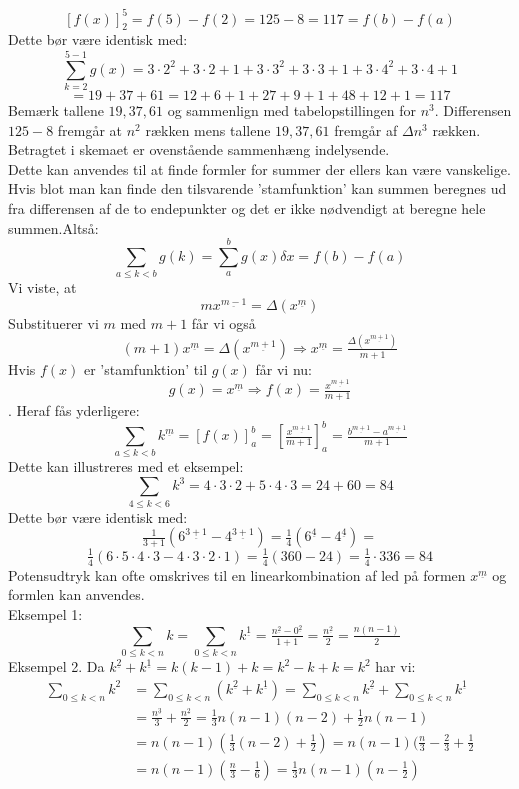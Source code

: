 \[[f(x)]_{2}^{5}=f(5)-f(2)=125-8=117=f(b)-f(a)\]
Dette bør være identisk med:
\[\sum_{k=2}^{5-1}g(x)=3 \cdot 2^{2}+3 \cdot 2+1+3 \cdot 3^{2}+3 \cdot 3+1+3 \cdot 4^{2}+3 \cdot 4+1\]
\[=19+37+61=12+6+1+27+9+1+48+12+1=117\]
Bemærk tallene \(19, 37,61\) og sammenlign med tabelopstillingen for \(n^{3}\). Differensen \(125-8\) fremgår at \(n^{2}\) rækken mens tallene \(19,37,61\) fremgår af \(\Delta n^{3}\) rækken. Betragtet i skemaet er ovenstående sammenhæng indelysende.\\
Dette kan anvendes  til at finde formler for summer der ellers kan være vanskelige. Hvis blot man kan finde den tilsvarende 'stamfunktion' kan summen beregnes ud fra differensen af de to endepunkter og det er ikke nødvendigt at beregne hele summen.Altså:
\[\sum_{a \leq k< b}g(k)=\sum_{a}^{b}g(x)\delta x=f(b)-f(a)\]
Vi viste, at 
\[mx^{\underline{m-1}}=\Delta (x^{\underline{m}})\]
Substituerer vi \(m\) med \(m+1\) får vi også 
\[(m+1)x^{\underline{m}}=\Delta (x^{\underline{m+1}}) \Rightarrow x^{\underline{m}}=\tfrac{\Delta (x^{\underline{m+1}})}{m+1}\]
Hvis \(f(x)\) er 'stamfunktion' til \(g(x)\) får vi nu: 
\[g(x)=x^{\underline{m}} \Rightarrow f(x)=\tfrac{x^{\underline{m+1}}}{m+1}\].
Heraf fås yderligere:
\[\sum_{a \leq k <b}k^{\underline{m}}=\left[f(x)\right]_{a}^{b}=\left[\tfrac{x^{\underline{m+1}}}{m+1}\right]_{a}^{b}=\tfrac{b^{\underline{m+1}}-a^{\underline{m+1}}}{m+1}\]
Dette kan illustreres med et eksempel:
\[\sum_{4 \leq k<6}k^{3}=4 \cdot 3 \cdot 2+5 \cdot 4 \cdot 3 =24+60=84\]
Dette bør være identisk med:
\[\tfrac{1}{3+1}(6^{\underline{3+1}}-4^{\underline{3+1}})=\tfrac{1}{4}(6^{\underline{4}}-4^{\underline{4}})=\]
\[\tfrac{1}{4}(6 \cdot 5 \cdot 4 \cdot 3 -4 \cdot 3 \cdot 2 \cdot 1)=\tfrac{1}{4}(360-24)=\tfrac{1}{4} \cdot 336=84\]
Potensudtryk kan ofte omskrives til en linearkombination af led på formen \(x^{\underline{m}}\) og formlen kan anvendes.\\
Eksempel 1: 
\[\sum_{0 \leq k < n}k=\sum_{0 \leq k < n}k^{\underline{1}}=\tfrac{n^{\underline{2}}-0^{\underline{2}}}{1+1}=\tfrac{n^{\underline{2}}}{2}=\tfrac{n(n-1)}{2}\]
Eksempel 2. Da \(k^{\underline{2}}+k^{\underline{1}}=k(k-1)+k=k^{2}-k+k=k^{2}\) har vi:
\begin{align*}
\sum_{0 \leq k <n}k^{2}&=\sum_{0 \leq k < n}(k^{\underline{2}}+k^{\underline{1}})=\sum_{0 \leq k <n}k^{\underline{2}}+\sum_{0 \leq k <n}k^{\underline{1}}\\
&=\tfrac{n^{\underline{3}}}{3}+\tfrac{n^{\underline{2}}}{2}=\tfrac{1}{3}n(n-1)(n-2)+\tfrac{1}{2}n(n-1)\\
&=n(n-1)(\tfrac{1}{3}(n-2)+\tfrac{1}{2})=n(n-1)(\tfrac{n}{3}-\tfrac{2}{3}+\tfrac{1}{2}\\
&=n(n-1)(\tfrac{n}{3}-\tfrac{1}{6})=\tfrac{1}{3}n(n-1)(n-\tfrac{1}{2})
\end{align*}
